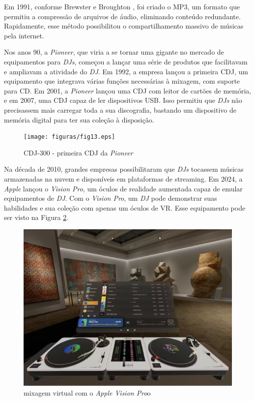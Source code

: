 Em 1991, conforme Brewster e Broughton \cite{lastnight}, foi criado o MP3, um formato que permitiu a compressão de arquivos de áudio, eliminando conteúdo redundante. Rapidamente, esse método possibilitou o compartilhamento massivo de músicas pela internet.

Nos anos 90, a \textit{Pioneer}, que viria a se tornar uma gigante no mercado de equipamentos para \textit{DJs}, começou a lançar uma série de produtos que facilitavam e ampliavam a atividade do \textit{DJ}. Em 1992, a empresa lançou a primeira CDJ, um equipamento que integrava várias funções necessárias à mixagem, com suporte para CD. Em 2001, a \textit{Pioneer} lançou uma CDJ com leitor de cartões de memória, e em 2007, uma CDJ capaz de ler dispositivos USB. Isso permitiu que \textit{DJs} não precisassem mais carregar toda a sua discografia, bastando um dispositivo de memória digital para ter sua coleção à disposição.

\begin{figure}[h]
	\centering
    \texttt{[image: figuras/fig13.eps]}
	\caption{CDJ-300 - primeira CDJ da \textit{Pioneer} \cite{cdj300}}
	\label{fig13}
\end{figure}

Na década de 2010, grandes empresas possibilitaram que \textit{DJs} tocassem músicas armazenadas na nuvem e disponíveis em plataformas de streaming. Em 2024, a \textit{Apple} lançou o \textit{Vision Pro}, um óculos de realidade aumentada capaz de emular equipamentos de \textit{DJ}. Com o \textit{Vision Pro}, um \textit{DJ} pode demonstrar suas habilidades e sua coleção com apenas um óculos de VR. Esse equipamento pode ser visto na Figura \ref{fig16}.

\begin{figure}[h]
	\centering
    \includegraphics[scale=0.3]{figuras/fig16.eps}
	\caption{mixagem virtual com o \textit{Apple Vision Pro}o \cite{macmagazineDesenvolvedorFala}}
	\label{fig16}
\end{figure}

